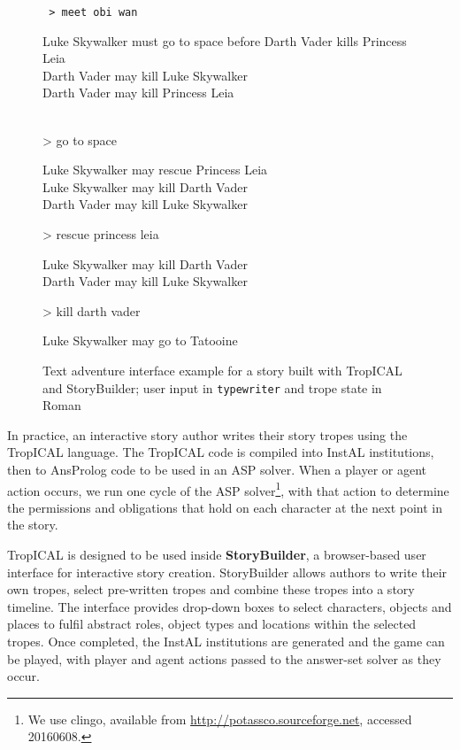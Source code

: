 \begin{figure}[!t]
{\begin{minipage}{0.95\columnwidth}
\begin{flushleft}\tt\small
> meet obi wan\\\smallskip
\hfill\begin{minipage}{0.95\columnwidth}\flushright\rm\noindent
Luke Skywalker must go to space before Darth Vader kills Princess Leia\\
Darth Vader may kill Luke Skywalker\\
Darth Vader may kill Princess Leia
\end{minipage}\\
> go to space\\\smallskip
\hfill\begin{minipage}{\columnwidth}\flushright\rm
Luke Skywalker may rescue Princess Leia\\
Luke Skywalker may kill Darth Vader\\
Darth Vader may kill Luke Skywalker
\end{minipage}
> rescue princess leia\\\smallskip
\hfill\begin{minipage}{\columnwidth}\flushright\rm
Luke Skywalker may kill Darth Vader\\
Darth Vader may kill Luke Skywalker
\end{minipage}
> kill darth vader\\\smallskip
\hfill\begin{minipage}{\columnwidth}\flushright\rm
Luke Skywalker may go to Tatooine
\end{minipage}
\end{flushleft}
\end{minipage}
}
\caption{Text adventure interface example for a story built with TropICAL and StoryBuilder; user input in {\tt typewriter} and trope state in Roman} \label{fig:text}
\end{figure}

In practice, an interactive story author writes their story tropes using the TropICAL language. The TropICAL code is compiled into InstAL institutions, then to AnsProlog code to be used in an ASP solver. When a player or agent action occurs, we run one cycle of the ASP solver\footnote{We use clingo, available from \url{http://potassco.sourceforge.net}, accessed 20160608.}, with that action to determine the permissions and obligations that hold on each character at the next point in the story.

TropICAL is designed to be used inside \textbf{StoryBuilder}, a browser-based user interface for interactive story creation. StoryBuilder allows authors to write their own tropes, select pre-written tropes and combine these tropes into a story timeline. The interface provides drop-down boxes to select characters, objects and places to fulfil abstract roles, object types and locations within the selected tropes. Once completed, the InstAL institutions are generated and the game can be played, with player and agent actions passed to the answer-set solver as they occur.

